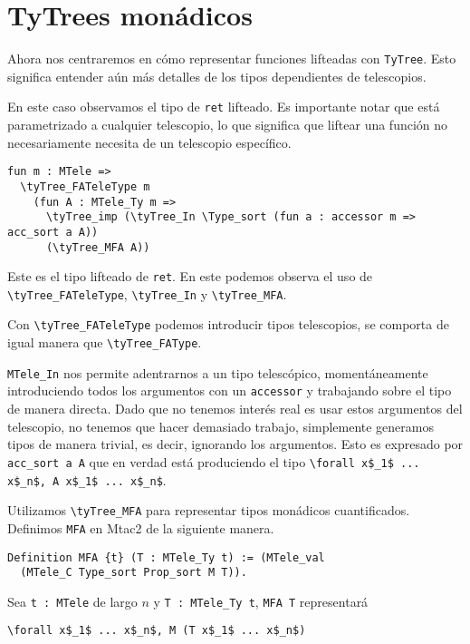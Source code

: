 \section{TyTrees monádicos}

Ahora nos centraremos en cómo representar funciones lifteadas con \lstinline{TyTree}.
Esto significa entender aún más detalles de los tipos dependientes de telescopios.

En este caso observamos el tipo de \lstinline{ret} lifteado.
Es importante notar que está parametrizado a cualquier telescopio, lo que significa que liftear una función no necesariamente necesita de un telescopio específico.

\begin{lstlisting}
fun m : MTele =>
  \tyTree_FATeleType m
    (fun A : MTele_Ty m =>
      \tyTree_imp (\tyTree_In \Type_sort (fun a : accessor m => acc_sort a A))
      (\tyTree_MFA A))
\end{lstlisting}

Este es el tipo lifteado de \lstinline{ret}.
En este podemos observa el uso de \lstinline{\tyTree_FATeleType}, \lstinline{\tyTree_In} y \lstinline{\tyTree_MFA}.

Con \lstinline{\tyTree_FATeleType} podemos introducir tipos telescopios, se comporta de igual manera que \lstinline{\tyTree_FAType}.

\lstinline{MTele_In} nos permite adentrarnos a un tipo telescópico, momentáneamente introduciendo todos los argumentos con un \lstinline{accessor} y trabajando sobre el tipo de manera directa.
Dado que no tenemos interés real es usar estos argumentos del telescopio, no tenemos que hacer demasiado trabajo, simplemente generamos tipos de manera trivial, es decir, ignorando los argumentos. Esto es expresado por \lstinline{acc_sort a A} que en verdad está produciendo el tipo \lstinline{\forall x$_1$ ... x$_n$, A x$_1$ ... x$_n$}.

Utilizamos \lstinline{\tyTree_MFA} para representar tipos monádicos cuantificados. Definimos \lstinline{MFA} en Mtac2 de la siguiente manera.

\begin{lstlisting}
Definition MFA {t} (T : MTele_Ty t) := (MTele_val
  (MTele_C Type_sort Prop_sort M T)).
\end{lstlisting}

Sea \lstinline{t : MTele} de largo $n$ y \lstinline{T : MTele_Ty t}, \lstinline{MFA T} representará
\begin{lstlisting}
\forall x$_1$ ... x$_n$, M (T x$_1$ ... x$_n$)
\end{lstlisting}


